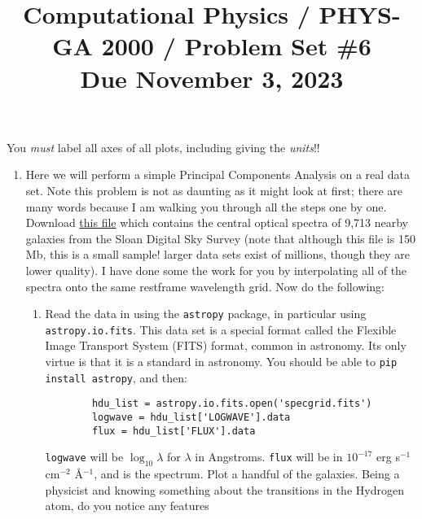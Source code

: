 \documentclass[11pt, preprint]{aastex}
\begin{document}
\title{\bf Computational Physics / PHYS-GA 2000 / Problem Set \#6
\\ Due November 3, 2023 }

You {\it must} label all axes of all plots, including giving the {\it
  units}!!

\begin{enumerate}
\item Here we will perform a simple Principal Components Analysis on a
  real data set. Note this problem is not as daunting as it might look
  at first; there are many words because I am walking you through all
  the steps one by one.  Download
  \href{https://www.dropbox.com/scl/fi/9cmawl762qtuwiouhmafs/specgrid.fits?rlkey=d2zcco18t5vfbib5nuxmsu411&dl=0}{this
    file} which contains the central optical spectra of 9,713 nearby
  galaxies from the Sloan Digital Sky Survey (note that although this
  file is 150 Mb, this is a small sample!  larger data sets exist of
  millions, though they are lower quality). I have done some the work
  for you by interpolating all of the spectra onto the same restframe
  wavelength grid. Now do the following:
  \begin{enumerate}
    \item Read the data in using the {\tt astropy} package, in
      particular using {\tt astropy.io.fits}. This data set is a
      special format called the Flexible Image Transport System (FITS)
      format, common in astronomy. Its only virtue is that it is a
      standard in astronomy. You should be able to {\tt pip install
        astropy}, and then:
      \begin{verbatim}
        hdu_list = astropy.io.fits.open('specgrid.fits')
        logwave = hdu_list['LOGWAVE'].data
        flux = hdu_list['FLUX'].data
      \end{verbatim}
      {\tt logwave} will be $\log_{10}\lambda$ for $\lambda$ in
      Angstroms. {\tt flux} will be in $10^{-17}$ erg s$^{-1}$
      cm$^{-2}$ \AA$^{-1}$, and is the spectrum. Plot a handful of the
      galaxies. Being a physicist and knowing something about the
      transitions in the Hydrogen atom, do you notice any features

\end{enumerate}
\end{enumerate}
\end{document}
